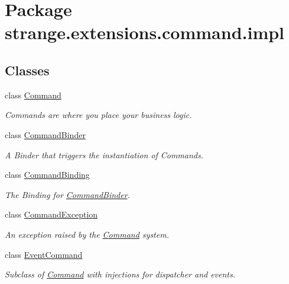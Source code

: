 \hypertarget{namespacestrange_1_1extensions_1_1command_1_1impl}{\section{Package strange.\-extensions.\-command.\-impl}
\label{namespacestrange_1_1extensions_1_1command_1_1impl}
}
\subsection*{Classes}
\begin{DoxyCompactItemize}
\item 
class \hyperlink{classstrange_1_1extensions_1_1command_1_1impl_1_1_command}{Command}
\begin{DoxyCompactList}\small\item\em Commands are where you place your business logic. \end{DoxyCompactList}\item 
class \hyperlink{classstrange_1_1extensions_1_1command_1_1impl_1_1_command_binder}{Command\-Binder}
\begin{DoxyCompactList}\small\item\em A Binder that triggers the instantiation of Commands. \end{DoxyCompactList}\item 
class \hyperlink{classstrange_1_1extensions_1_1command_1_1impl_1_1_command_binding}{Command\-Binding}
\begin{DoxyCompactList}\small\item\em The Binding for \hyperlink{classstrange_1_1extensions_1_1command_1_1impl_1_1_command_binder}{Command\-Binder}. \end{DoxyCompactList}\item 
class \hyperlink{classstrange_1_1extensions_1_1command_1_1impl_1_1_command_exception}{Command\-Exception}
\begin{DoxyCompactList}\small\item\em An exception raised by the \hyperlink{classstrange_1_1extensions_1_1command_1_1impl_1_1_command}{Command} system. \end{DoxyCompactList}\item 
class \hyperlink{classstrange_1_1extensions_1_1command_1_1impl_1_1_event_command}{Event\-Command}
\begin{DoxyCompactList}\small\item\em Subclass of \hyperlink{classstrange_1_1extensions_1_1command_1_1impl_1_1_command}{Command} with injections for dispatcher and events. \end{DoxyCompactList}\item 

\end{DoxyCompactItemize}

